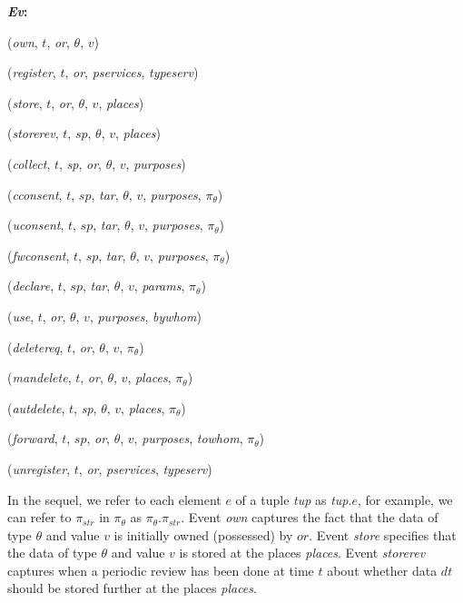 \documentclass[a4paper]{article}
\newcounter{qcounter}
\begin{document}
\begin{list}
{\bfseries{}\textit{Ev}\textit{}:~}
{
}
\item (\textit{own}, $t$, \textit{or}, $\theta$, $v$) 
\item (\textit{register}, $t$, \textit{or}, \textit{pservices}, \textit{typeserv}) 
\item (\textit{store}, $t$, \textit{or}, $\theta$, $v$, \textit{places})
\item (\textit{storerev}, $t$, $sp$, $\theta$, $v$, \textit{places})
\item (\textit{collect}, $t$, \textit{sp}, \textit{or}, $\theta$,  $v$,   \textit{purposes})
\item (\textit{cconsent}, $t$, $sp$, \textit{tar}, $\theta$, $v$,  \textit{purposes}, $\pi_{\theta}$)
\item (\textit{uconsent}, $t$, $sp$, \textit{tar}, $\theta$, $v$, \textit{purposes}, $\pi_{\theta}$)
\item (\textit{fwconsent}, $t$, $sp$, \textit{tar}, $\theta$, $v$, \textit{purposes}, $\pi_{\theta}$)
\item (\textit{declare}, $t$, $sp$, \textit{tar}, $\theta$, $v$, \textit{params}, $\pi_{\theta}$) 
\item (\textit{use}, $t$, \textit{or}, $\theta$, $v$, \textit{purposes}, \textit{bywhom}) 
\item (\textit{deletereq}, $t$, \textit{or}, $\theta$, $v$, $\pi_{\theta}$) 
\item (\textit{mandelete}, $t$, \textit{or}, $\theta$, $v$, \textit{places}, $\pi_{\theta}$) 
\item (\textit{autdelete}, $t$, \textit{sp}, $\theta$, $v$, \textit{places}, $\pi_{\theta}$) 
\item (\textit{forward}, $t$, $sp$, \textit{or}, $\theta$, $v$, \textit{purposes}, \textit{towhom}, $\pi_{\theta}$)
\item (\textit{unregister}, $t$, \textit{or}, \textit{pservices}, \textit{typeserv})
\end{list} 


In the sequel, we refer to each element $e$ of a tuple \textit{tup} as \textit{tup}.$e$, for example, we can refer to $\pi_{str}$ in $\pi_{\theta}$ as $\pi_{\theta}$.$\pi_{str}$. Event \textit{own} captures the fact that the data of type $\theta$ and value $v$ is initially owned (possessed) by $or$. Event \textit{store} specifies that the data of type $\theta$ and value $v$ is 
stored at the places \textit{places}. Event \textit{storerev} captures when a periodic review has been done at time $t$ about whether data $dt$ should be stored further at the places \textit{places}.   
\end{document}
